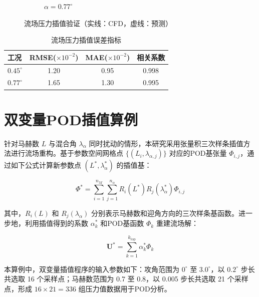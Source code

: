 \begin{figure}[H]
\begin{subfigure}[b]{0.45\textwidth}
        \caption{$\alpha=0.77^\circ$}
    \end{subfigure}
    \caption{\songti 流场压力插值验证（实线：CFD，虚线：预测）}
    \label{fig:flow_validation}
\end{figure}

\begin{table}[H]
    \centering
    \caption{流场压力插值误差指标}
    \label{tab:flow_error}
    \begin{tabular}{lccc}
        \toprule
        工况 & RMSE($\times10^{-2}$) & MAE($\times10^{-2}$) & 相关系数 \\
        \midrule
        $0.45^\circ$ & 1.20 & 0.95 & 0.998 \\
        $0.77^\circ$ & 1.65 & 1.30 & 0.995 \\
        \bottomrule
    \end{tabular}
\end{table}

\section{双变量POD插值算例}
\label{sec:double_variable_pod}

针对马赫数 \( L \) 与混合角 \( \lambda_\alpha \) 同时扰动的情形，本研究采用张量积三次样条插值方法进行流场重构。基于参数空间网格点 \(\{(L_i, \lambda_{\alpha,j})\}\) 对应的POD基张量 \(\Phi_{i,j}\)，通过如下公式计算新参数点 \((L^*, \lambda_\alpha^*)\) 的插值基：

\begin{equation}
    \Phi^* = \sum_{i=1}^{n_M} \sum_{j=1}^{n_\alpha} R_i(L^*) R_j(\lambda_\alpha^*) \Phi_{i,j}
    \label{eq:double_spline}
\end{equation}

其中，\( R_i(L) \) 和 \( R_j(\lambda_\alpha) \) 分别表示马赫数和迎角方向的三次样条基函数。进一步地，利用插值得到的系数 \(\alpha_k^*\) 和POD基函数 \(\Phi_k\) 重建流场解：

\begin{equation}
    \mathbf{U}^* = \sum_{k=1}^{k_{\text{top}}} \alpha_k^* \Phi_k
    \label{eq:double_solution}
\end{equation}

本算例中，双变量插值程序的输入参数如下：攻角范围为 \(0^\circ\) 至 \(3.0^\circ\)，以 \(0.2^\circ\) 步长共选取 16 个采样点；马赫数范围为 0.7 至 0.8，以 0.005 步长共选取 21 个采样点，形成 \(16 \times 21 = 336\) 组压力值数据用于POD分析。

